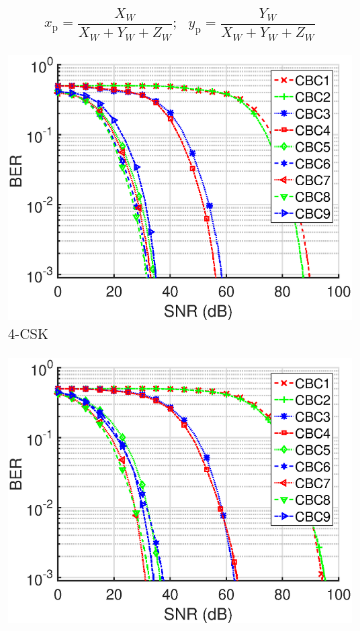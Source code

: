 \documentclass[10pt,letterpaper]{article}
\begin{document}
\begin{equation}
	x_{\text{p}} = \frac{X_{W}}{X_{W}+Y_{W}+Z_{W}}; \text{  } y_{\text{p}} = \frac{Y_{W}}{X_{W}+Y_{W}+Z_{W}} %
	\label{eqWXY}
\end{equation}

\begin{figure}[t]
	\centering
		\begin{subfigure}{0.49\textwidth}
		\centering
			\includegraphics[trim={0.1in 0.0in 0.5in 0.3in}, clip=true, width=\textwidth]{M04_4-CSK_BERvsSNR_NL.eps}
			\caption{4-CSK}
			\label{fig4SNR_NL}
		\end{subfigure}
		\hfill
		\begin{subfigure}{0.49\textwidth}
		\centering
			\includegraphics[trim={0.1in 0.0in 0.5in 0.3in}, clip=true, width=\textwidth]{M08_8-CSK_BERvsSNR_NL.eps}

\end{subfigure}
\end{figure}
\end{document}
